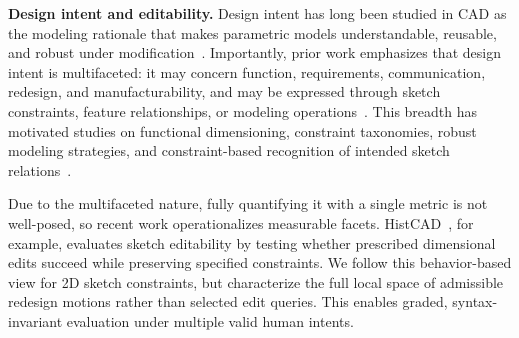 \textbf{Design intent and editability.}
Design intent has long been studied in CAD as the modeling rationale that makes parametric models understandable, reusable, and robust under modification~\cite{iyer2006design,otey2018revisiting}. Importantly, prior work emphasizes that design intent is multifaceted: it may concern function, requirements, communication, redesign, and manufacturability, and may be expressed through sketch constraints, feature relationships, or modeling operations~\cite{otey2018revisiting}. This breadth has motivated studies on functional dimensioning, constraint taxonomies, robust modeling strategies, and constraint-based recognition of intended sketch relations~\cite{otto2015framework,naya2020role,nerenst2023parametric,kyratzi2021constraint}.

Due to the multifaceted nature, fully quantifying it with a single metric is not well-posed, so recent work operationalizes measurable facets. HistCAD~\cite{dong2025histcad}, for example, evaluates sketch editability by testing whether prescribed dimensional edits succeed while preserving specified constraints. We follow this behavior-based view for 2D sketch constraints, but characterize the full local space of admissible redesign motions rather than selected edit queries. This enables graded, syntax-invariant evaluation under multiple valid human intents.
